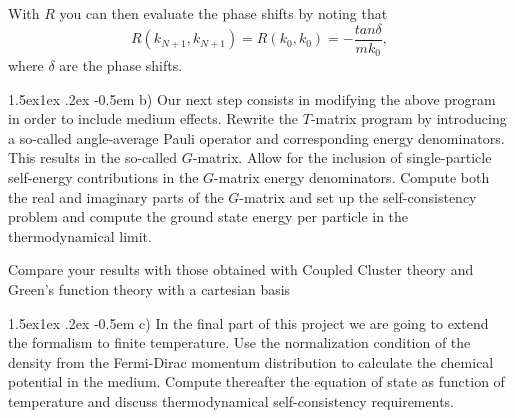 \documentclass[%
twoside,                 %
final,                   %
10pt]{article}
\makeatletter
\newenvironment{doconceexercise}{}{}
\newcommand\subex{\@startsection{paragraph}{4}{\z@}%
                  {1.5ex\@plus1ex \@minus.2ex}%
                  {-0.5em}%
                  {\normalfont\normalsize\bfseries}}
\makeatother
\begin{document}
\begin{doconceexercise}
With $R$ you can then evaluate the phase shifts
by noting that 
\[
      R(k_{N+1},k_{N+1})=R(k_0,k_0)=-\frac{tan\delta}{mk_0},
\]
where $\delta$ are the phase shifts.


\subex{b)}
Our next step consists in modifying the above program in order to include medium effects.
Rewrite the $T$-matrix program by introducing a so-called angle-average Pauli operator
and corresponding energy denominators. This results in the so-called $G$-matrix.
Allow for the inclusion of single-particle self-energy contributions in the $G$-matrix energy denominators. Compute both the real and imaginary parts of the $G$-matrix and set up the self-consistency problem and compute the ground state energy per particle in the thermodynamical limit.

Compare your results with those obtained with Coupled Cluster theory
and Green's function theory with a cartesian basis


\subex{c)}
In the final part of this project we are going to extend the formalism to finite temperature.
Use the normalization condition of the density from the Fermi-Dirac momentum distribution 
to calculate the chemical potential in the medium. Compute thereafter the equation of state 
as function of temperature and discuss thermodynamical self-consistency requirements.






\end{doconceexercise}




\printindex
\end{document}
